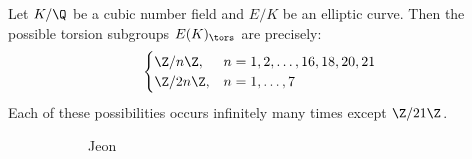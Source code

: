 \begin{frame}[plain]
\begin{thm}
Let $K/\Q$ be a cubic number field and $E/K$ be an elliptic curve. Then the possible torsion subgroups $E(K)_\tors$ are precisely:
	\[
	\begin{cases}
	\Z/n\Z, & n=1,2,\ldots,16,18,20,21 \\
	\Z/2n\Z, & n=1,\ldots,7
	\end{cases}
	\] 
Each of these possibilities occurs infinitely many times except $\Z/21\Z$.
\end{thm}
	\begin{figure}[h]
	\centering
	\begin{subfigure}{0.10\textwidth}
	\captionsetup{labelformat=empty}
	\centering
	\caption{\hspace{0.2cm}\scriptsize{Jeon}}
	\end{subfigure} \quad\quad
	\begin{subfigure}{0.10\textwidth}
	\captionsetup{labelformat=empty}
	\centering

\end{subfigure}
\end{figure}
\end{frame}
